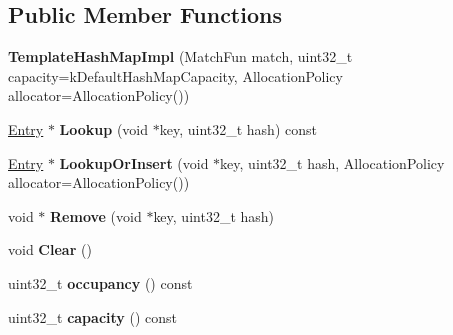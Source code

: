 \subsection*{Public Member Functions}
\begin{DoxyCompactItemize}
\item 
{\bfseries Template\+Hash\+Map\+Impl} (Match\+Fun match, uint32\+\_\+t capacity=k\+Default\+Hash\+Map\+Capacity, Allocation\+Policy allocator=Allocation\+Policy())\hypertarget{classv8_1_1internal_1_1_template_hash_map_impl_af9ef8882294388c3de6c339f0d88ad45}{}\label{classv8_1_1internal_1_1_template_hash_map_impl_af9ef8882294388c3de6c339f0d88ad45}

\item 
\hyperlink{structv8_1_1internal_1_1_template_hash_map_impl_1_1_entry}{Entry} $\ast$ {\bfseries Lookup} (void $\ast$key, uint32\+\_\+t hash) const \hypertarget{classv8_1_1internal_1_1_template_hash_map_impl_ad880c910156e8f3d0f45e3344ef03510}{}\label{classv8_1_1internal_1_1_template_hash_map_impl_ad880c910156e8f3d0f45e3344ef03510}

\item 
\hyperlink{structv8_1_1internal_1_1_template_hash_map_impl_1_1_entry}{Entry} $\ast$ {\bfseries Lookup\+Or\+Insert} (void $\ast$key, uint32\+\_\+t hash, Allocation\+Policy allocator=Allocation\+Policy())\hypertarget{classv8_1_1internal_1_1_template_hash_map_impl_a07c33ad66e39e62d45579cdeddf8ceba}{}\label{classv8_1_1internal_1_1_template_hash_map_impl_a07c33ad66e39e62d45579cdeddf8ceba}

\item 
void $\ast$ {\bfseries Remove} (void $\ast$key, uint32\+\_\+t hash)\hypertarget{classv8_1_1internal_1_1_template_hash_map_impl_a4144fe2e3ff1c7496d12678e20148e0e}{}\label{classv8_1_1internal_1_1_template_hash_map_impl_a4144fe2e3ff1c7496d12678e20148e0e}

\item 
void {\bfseries Clear} ()\hypertarget{classv8_1_1internal_1_1_template_hash_map_impl_a3ee691337d597cfbb218c38332a6e3a7}{}\label{classv8_1_1internal_1_1_template_hash_map_impl_a3ee691337d597cfbb218c38332a6e3a7}

\item 
uint32\+\_\+t {\bfseries occupancy} () const \hypertarget{classv8_1_1internal_1_1_template_hash_map_impl_a1b12dfbef0f39e5fee47a75f52479924}{}\label{classv8_1_1internal_1_1_template_hash_map_impl_a1b12dfbef0f39e5fee47a75f52479924}

\item 
uint32\+\_\+t {\bfseries capacity} () const \hypertarget{classv8_1_1internal_1_1_template_hash_map_impl_a94411e49edab1950813f5e62c2fdf4a3}{}\label{classv8_1_1internal_1_1_template_hash_map_impl_a94411e49edab1950813f5e62c2fdf4a3}


\end{DoxyCompactItemize}

